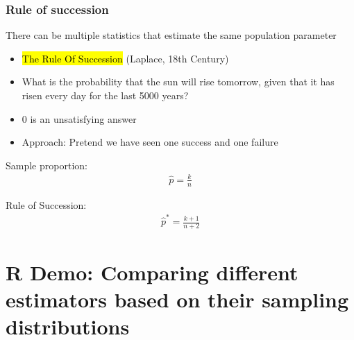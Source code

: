 \documentclass[t,compress,mathserif]{beamer}
\begin{document}
\begin{frame}
    \frametitle{Rule of succession}

    There can be multiple statistics that estimate the same population parameter
    \begin{itemize}

        \item \hl{The Rule Of Succession} (Laplace, 18th Century)
        \item What is the probability that the sun will rise tomorrow, given that it has risen every day for the last 5000 years?
        \item 0 is an unsatisfying answer
        \item Approach: Pretend we have seen one success and one failure
    
    \end{itemize}

    Sample proportion:
     \begin{align}
        \hat{p}=\frac{k}{n}
    \end{align}
 
    Rule of Succession:
    \begin{align}
        \hat{p}^*=\frac{k +1}{n+2}
    \end{align}
 
\end{frame}



\section{R Demo: Comparing different estimators based on their sampling distributions}

\end{document}

